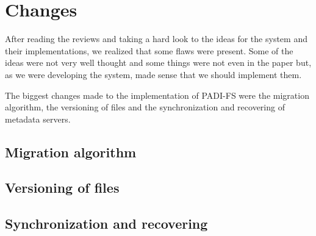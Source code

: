 \section{Changes}

After reading the reviews and taking a hard look to the ideas for the system and
their implementations, we realized that some flaws were present. Some of the
ideas were not very well thought and some things were not even in the paper
but, as we were developing the system, made sense that we should implement
them.

The biggest changes made to the implementation of PADI-FS were the migration
algorithm, the versioning of files and the synchronization and recovering of
metadata servers.

\subsection{Migration algorithm}

\subsection{Versioning of files}

\subsection{Synchronization and recovering}